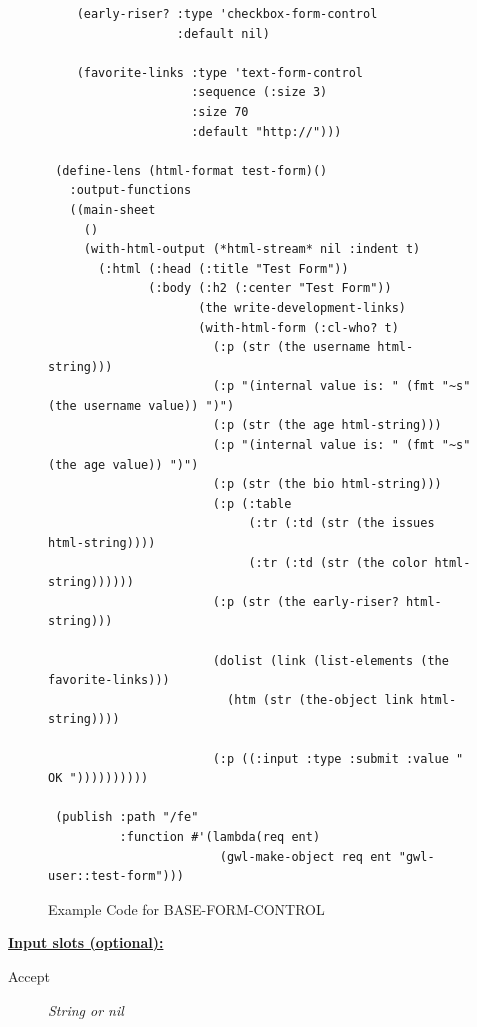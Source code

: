 \documentclass [11pt]{book}
\begin{document}
\begin{itemize}
\begin{figure}
\begin{lrbox}{\boxedverb}
\begin{minipage}{\linewidth}
{\begin{verbatim}
    (early-riser? :type 'checkbox-form-control
                  :default nil)
   
    (favorite-links :type 'text-form-control
                    :sequence (:size 3)
                    :size 70
                    :default "http://")))

 (define-lens (html-format test-form)()
   :output-functions
   ((main-sheet
     ()
     (with-html-output (*html-stream* nil :indent t)
       (:html (:head (:title "Test Form"))
              (:body (:h2 (:center "Test Form"))
                     (the write-development-links)
                     (with-html-form (:cl-who? t)
                       (:p (str (the username html-string)))
                       (:p "(internal value is: " (fmt "~s" (the username value)) ")")
                       (:p (str (the age html-string)))
                       (:p "(internal value is: " (fmt "~s" (the age value)) ")")
                       (:p (str (the bio html-string)))
                       (:p (:table 
                            (:tr (:td (str (the issues html-string))))
                            (:tr (:td (str (the color html-string))))))
                       (:p (str (the early-riser? html-string)))
                      
                       (dolist (link (list-elements (the favorite-links)))
                         (htm (str (the-object link html-string))))
                      
                       (:p ((:input :type :submit :value " OK "))))))))))
 
 (publish :path "/fe"
          :function #'(lambda(req ent)
                        (gwl-make-object req ent "gwl-user::test-form")))

\end{verbatim}}
\end{minipage}
\end{lrbox}
\fbox{\usebox{\boxedverb}}

\caption{Example Code for BASE-FORM-CONTROL}

\label{fig:example-code-BASE-FORM-CONTROL}

\end{figure}





\textbf{
\underline{Input slots (optional):}}

\begin{description}

\item [Accept]
\emph{String or nil}


\end{description}
\end{itemize}
\end{document}
